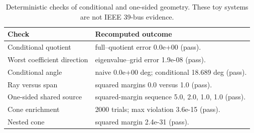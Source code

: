 \begin{table}[t]
\caption{Deterministic checks of conditional and one-sided geometry. These toy systems are not IEEE 39-bus evidence.}
\label{tab:supp-cone-geometry-checks}
\centering
\scriptsize
\begin{tabularx}{\columnwidth}{@{}p{}X@{}}
\toprule
Check & Recomputed outcome \\
\midrule
Conditional quotient & full--quotient error 0.0e+00 (pass). \\
Worst coefficient direction & eigenvalue--grid error 1.9e-08 (pass). \\
Conditional angle & naive 0.0e+00 deg; conditional 18.689 deg (pass). \\
Ray versus span & squared margins 0.0 versus 1.0 (pass). \\
One-sided shared source & squared-margin sequence 5.0, 2.0, 1.0, 1.0 (pass). \\
Cone enrichment & 2000 trials; max violation 3.6e-15 (pass). \\
Nested cone & squared margin 2.4e-31 (pass). \\
\bottomrule
\end{tabularx}
\end{table}
